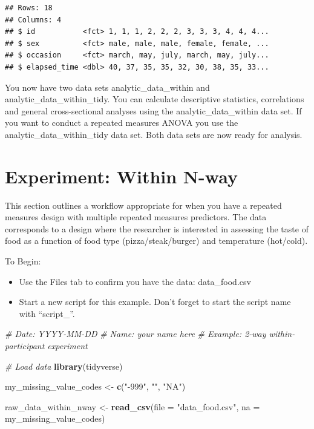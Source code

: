 \documentclass[
]{krantz}
\makeatletter
\newenvironment{Shaded}{\begin{snugshade}}{\end{snugshade}}
\newcommand{\CommentTok}[1]{\textcolor[rgb]{0.37,0.37,0.37}{\textit{#1}}}
\newcommand{\DataTypeTok}[1]{\textcolor[rgb]{0.27,0.27,0.27}{#1}}
\newcommand{\KeywordTok}[1]{\textcolor[rgb]{0.27,0.27,0.27}{\textbf{#1}}}
\newcommand{\NormalTok}[1]{#1}
\newcommand{\StringTok}[1]{\textcolor[rgb]{0.5,0.5,0.5}{#1}}
\newenvironment{kframe}{%
\medskip{}
\setlength{\fboxsep}{.8em}
 \def\at@end@of@kframe{}%
 \ifinner\ifhmode%
  \def\at@end@of@kframe{\end{minipage}}%
  \begin{minipage}{\columnwidth}%
 \fi\fi%
 \def\FrameCommand##1{\hskip\@totalleftmargin \hskip-\fboxsep
 \colorbox{shadecolor}{##1}\hskip-\fboxsep
     \hskip-\linewidth \hskip-\@totalleftmargin \hskip\columnwidth}%
 \MakeFramed {\advance\hsize-\width
   \@totalleftmargin\z@ \linewidth\hsize
   \@setminipage}}%
 {\par\unskip\endMakeFramed%
 \at@end@of@kframe}
\renewenvironment{Shaded}{\begin{kframe}}{\end{kframe}}
\makeatother
\begin{document}
\begin{verbatim}
## Rows: 18
## Columns: 4
## $ id           <fct> 1, 1, 1, 2, 2, 2, 3, 3, 3, 4, 4, 4...
## $ sex          <fct> male, male, male, female, female, ...
## $ occasion     <fct> march, may, july, march, may, july...
## $ elapsed_time <dbl> 40, 37, 35, 35, 32, 30, 38, 35, 33...
\end{verbatim}

You now have two data sets analytic\_data\_within and analytic\_data\_within\_tidy. You can calculate descriptive statistics, correlations and general cross-sectional analyses using the analytic\_data\_within data set. If you want to conduct a repeated measures ANOVA you use the analytic\_data\_within\_tidy data set. Both data sets are now ready for analysis.

\hypertarget{experiment-within-n-way}{%
\section{Experiment: Within N-way}\label{experiment-within-n-way}}

This section outlines a workflow appropriate for when you have a repeated measures design with multiple repeated measures predictors. The data corresponds to a design where the researcher is interested in assessing the taste of food as a function of food type (pizza/steak/burger) and temperature (hot/cold).

To Begin:

\begin{itemize}
\item
  Use the Files tab to confirm you have the data: data\_food.csv
\item
  Start a new script for this example. Don't forget to start the script name with ``script\_''.
\end{itemize}

\begin{Shaded}
\begin{Highlighting}[]
\CommentTok{# Date: YYYY-MM-DD}
\CommentTok{# Name: your name here}
\CommentTok{# Example: 2-way within-participant experiment}

\CommentTok{# Load data}
\KeywordTok{library}\NormalTok{(tidyverse)}

\NormalTok{my_missing_value_codes <-}\StringTok{ }\KeywordTok{c}\NormalTok{(}\StringTok{"-999"}\NormalTok{, }\StringTok{""}\NormalTok{, }\StringTok{"NA"}\NormalTok{)}

\NormalTok{raw_data_within_nway <-}\StringTok{ }\KeywordTok{read_csv}\NormalTok{(}\DataTypeTok{file =} \StringTok{"data_food.csv"}\NormalTok{,}
                     \DataTypeTok{na =}\NormalTok{ my_missing_value_codes)}
\end{Highlighting}
\end{Shaded}
\end{document}
